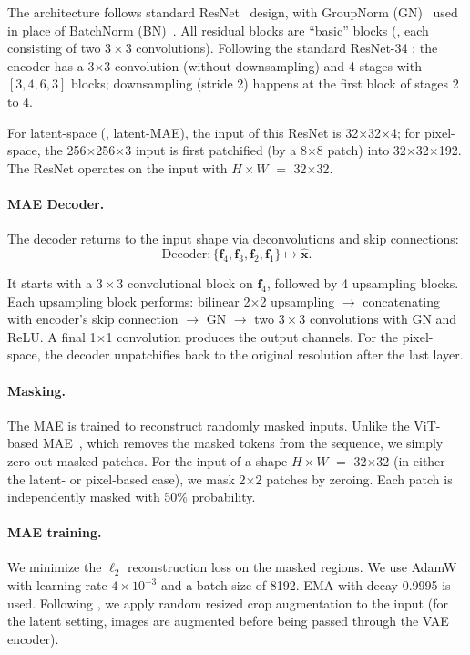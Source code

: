 The architecture follows standard ResNet~\citep{he2016deep} design, with GroupNorm (GN)~\citep{wu2018group} used in place of BatchNorm (BN)~\citep{ioffe2015batch}.
All residual blocks are ``basic'' blocks (\ie, each consisting of two $3{\times}3$ convolutions).
Following the standard ResNet-34 \citep{he2016deep}: 
the encoder has a 3${\times}$3 convolution (without downsampling) and 4 stages with $[3, 4, 6, 3]$ blocks; downsampling (stride 2) happens at the first block of stages 2 to 4.

For latent-space (\ie, latent-MAE), the input of this ResNet is 32$\times$32$\times$4; for pixel-space, the 256$\times$256$\times$3 input is first patchified (by a 8$\times$8 patch) into 32$\times$32$\times$192. The ResNet operates on the input with $H{\times}W$ $=$ 32$\times$32.

\paragraph{MAE Decoder.}
The decoder returns to the input shape via deconvolutions and skip connections:
\[
\text{Decoder}: \{\mathbf{f}_4, \mathbf{f}_3, \mathbf{f}_2, \mathbf{f}_1\} \mapsto \hat{\mathbf{x}}.
\]

It starts with a $3{\times}3$ convolutional block on $\mathbf{f}_4$, followed by 4 upsampling blocks.
Each upsampling block performs: bilinear 2${\times}$2 upsampling $\to$ concatenating with encoder's skip connection $\to$ GN $\to$ two $3{\times}3$ convolutions with GN and ReLU.
A final 1${\times}$1 convolution produces the output channels. For the pixel-space, the decoder unpatchifies back to the original resolution after the last layer.

\paragraph{Masking.}
The MAE is trained to reconstruct randomly masked inputs.
Unlike the ViT-based MAE~\citep{he2022masked}, which removes the masked tokens from the sequence, we simply zero out masked patches.
For the input of a shape $H{\times}W$ $=$ 32$\times$32 (in either the latent- or pixel-based case), we mask 2${\times}$2 patches by zeroing.
Each patch is independently masked with 50\% probability.

\paragraph{MAE training.}
We minimize the $\ell_2$ reconstruction loss on the masked regions.
We use AdamW \cite{Loshchilov2019} with learning rate $4{\times}10^{-3}$ and a batch size of 8192. EMA with decay 0.9995 is used.
Following \cite{he2022masked}, we apply random resized crop augmentation to the input (for the latent setting, images are augmented before being passed through the VAE encoder).

